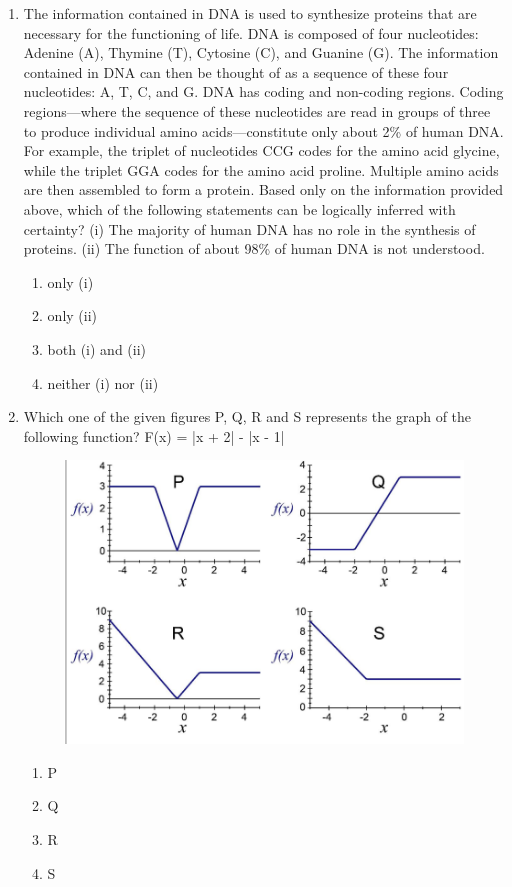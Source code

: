 \documentclass[journal,12pt,onecolumn]{IEEEtran}
\begin{document}
\begin{enumerate}
    \item The information contained in DNA is used to synthesize proteins that are necessary for the functioning of life. DNA is composed of four nucleotides: Adenine (A), Thymine (T), Cytosine (C), and Guanine (G). The information contained in DNA can then be thought of as a sequence of these four nucleotides: A, T, C, and G. DNA has coding and non-coding regions. Coding regions---where the sequence of these nucleotides are read in groups of three to produce individual amino acids---constitute only about 2\% of human DNA. For example, the triplet of nucleotides CCG codes for the amino acid glycine, while the triplet GGA codes for the amino acid proline. Multiple amino acids are then assembled to form a protein.
    Based only on the information provided above, which of the following statements can be logically inferred with certainty?
    (i) The majority of human DNA has no role in the synthesis of proteins.
    (ii) The function of about 98\% of human DNA is not understood.
    \begin{enumerate}
        \item only (i)
        \item only (ii)
        \item both (i) and (ii)
        \item neither (i) nor (ii)
    \end{enumerate}

    \item Which one of the given figures P, Q, R and S represents the graph of the following function?
    F(x) = |x + 2| - |x - 1|
    \begin{figure}[H]
		\centering
	\includegraphics[scale=0.5]{9}
		    \caption*{}
		\label{fig:Q9}
	\end{figure}
    \begin{enumerate}
        \item P
        \item Q
        \item R
        \item S
    \end{enumerate}


\end{enumerate}
\end{document}
